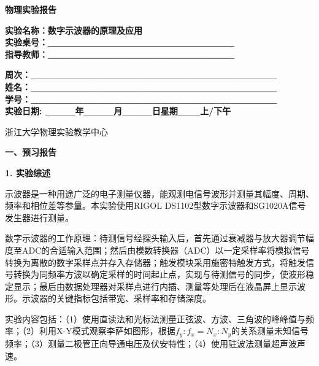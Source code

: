 \documentclass[a4paper,12pt]{article}
\begin{document}
\begin{center}
    \vspace*{2cm}
    {\fontsize{36pt}{43pt}\selectfont \textbf{物理实验报告}}
    \vspace{3cm}
\end{center}

\begin{center}
    \fontsize{16pt}{24pt}\selectfont
    \textbf{实验名称：数字示波器的原理及应用\quad} \\[0.5em]
    \textbf{实验桌号：\_\_\_\_\_\_\_\_\_\_\_\_\_\_\_\_\_\_\_\_\_\_\_\_\_} \\[0.5em]
    \textbf{指导教师：\_\_\_\_\_\_\_\_\_\_\_\_\_\_\_\_\_\_\_\_\_\_\_\_\_}
\end{center}

\vspace{2cm}

\begin{center}
    \fontsize{14pt}{28pt}\selectfont
    \textbf{周次：\_\_\_\_\_\_\_\_\_\_\_\_\_\_\_\_\_\_\_\_\_\_\_\_\_\_\_\_\_\_\_\_\_} \\
    \textbf{姓名：\_\_\_\_\_\_\_\_\_\_\_\_\_\_\_\_\_\_\_\_\_\_\_\_\_\_\_\_\_\_\_\_\_} \\
    \textbf{学号：\_\_\_\_\_\_\_\_\_\_\_\_\_\_\_\_\_\_\_\_\_\_\_\_\_\_\_\_\_\_\_\_\_} \\[0.5em]
    \textbf{实验日期: \_\_\_\_年\_\_\_\_月\_\_\_\_日\quad 星期\_\_\_上/下午}
\end{center}

\vspace{1.5cm}

\begin{center}
    \fontsize{14pt}{20pt}\selectfont
    浙江大学物理实验教学中心
\end{center}

\newpage

{\fontsize{16pt}{24pt}\selectfont \textbf{一、预习报告}}

\vspace{0.5cm}
{\fontsize{14pt}{20pt}\selectfont \textbf{1. 实验综述}}

\vspace{0.3cm}

{\fontsize{12pt}{18pt}\selectfont

示波器是一种用途广泛的电子测量仪器，能观测电信号波形并测量其幅度、周期、频率和相位差等参量。本实验使用RIGOL DS1102型数字示波器和SG1020A信号发生器进行测量。

数字示波器的工作原理：待测信号经探头输入后，首先通过衰减器与放大器调节幅度至ADC的合适输入范围；然后由模数转换器（ADC）以一定采样率将模拟信号转换为离散的数字采样点并存入存储器；触发模块采用施密特触发方式，将触发信号转换为同频率方波以确定采样的时间起止点，实现与待测信号的同步，使波形稳定显示；最后由数据处理器对采样点进行内插、测量等处理后在液晶屏上显示波形。示波器的关键指标包括带宽、采样率和存储深度。

实验内容包括：（1）使用直读法和光标法测量正弦波、方波、三角波的峰峰值与频率；（2）利用X-Y模式观察李萨如图形，根据$f_y : f_x = N_x : N_y$的关系测量未知信号频率；（3）测量二极管正向导通电压及伏安特性；（4）使用驻波法测量超声波声速。

}
\end{document}
